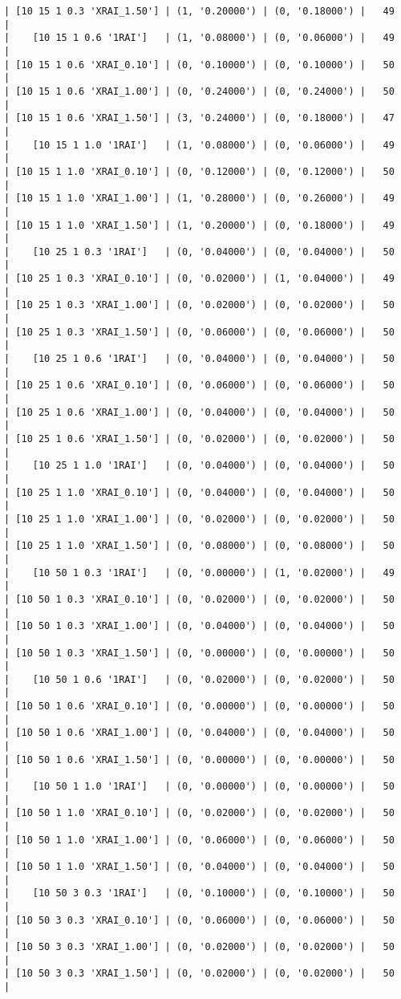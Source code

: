 \documentclass{article}
\begin{document}
\begin{verbatim}
| [10 15 1 0.3 'XRAI_1.50'] | (1, '0.20000') | (0, '0.18000') |   49  |
|    [10 15 1 0.6 '1RAI']   | (1, '0.08000') | (0, '0.06000') |   49  |
| [10 15 1 0.6 'XRAI_0.10'] | (0, '0.10000') | (0, '0.10000') |   50  |
| [10 15 1 0.6 'XRAI_1.00'] | (0, '0.24000') | (0, '0.24000') |   50  |
| [10 15 1 0.6 'XRAI_1.50'] | (3, '0.24000') | (0, '0.18000') |   47  |
|    [10 15 1 1.0 '1RAI']   | (1, '0.08000') | (0, '0.06000') |   49  |
| [10 15 1 1.0 'XRAI_0.10'] | (0, '0.12000') | (0, '0.12000') |   50  |
| [10 15 1 1.0 'XRAI_1.00'] | (1, '0.28000') | (0, '0.26000') |   49  |
| [10 15 1 1.0 'XRAI_1.50'] | (1, '0.20000') | (0, '0.18000') |   49  |
|    [10 25 1 0.3 '1RAI']   | (0, '0.04000') | (0, '0.04000') |   50  |
| [10 25 1 0.3 'XRAI_0.10'] | (0, '0.02000') | (1, '0.04000') |   49  |
| [10 25 1 0.3 'XRAI_1.00'] | (0, '0.02000') | (0, '0.02000') |   50  |
| [10 25 1 0.3 'XRAI_1.50'] | (0, '0.06000') | (0, '0.06000') |   50  |
|    [10 25 1 0.6 '1RAI']   | (0, '0.04000') | (0, '0.04000') |   50  |
| [10 25 1 0.6 'XRAI_0.10'] | (0, '0.06000') | (0, '0.06000') |   50  |
| [10 25 1 0.6 'XRAI_1.00'] | (0, '0.04000') | (0, '0.04000') |   50  |
| [10 25 1 0.6 'XRAI_1.50'] | (0, '0.02000') | (0, '0.02000') |   50  |
|    [10 25 1 1.0 '1RAI']   | (0, '0.04000') | (0, '0.04000') |   50  |
| [10 25 1 1.0 'XRAI_0.10'] | (0, '0.04000') | (0, '0.04000') |   50  |
| [10 25 1 1.0 'XRAI_1.00'] | (0, '0.02000') | (0, '0.02000') |   50  |
| [10 25 1 1.0 'XRAI_1.50'] | (0, '0.08000') | (0, '0.08000') |   50  |
|    [10 50 1 0.3 '1RAI']   | (0, '0.00000') | (1, '0.02000') |   49  |
| [10 50 1 0.3 'XRAI_0.10'] | (0, '0.02000') | (0, '0.02000') |   50  |
| [10 50 1 0.3 'XRAI_1.00'] | (0, '0.04000') | (0, '0.04000') |   50  |
| [10 50 1 0.3 'XRAI_1.50'] | (0, '0.00000') | (0, '0.00000') |   50  |
|    [10 50 1 0.6 '1RAI']   | (0, '0.02000') | (0, '0.02000') |   50  |
| [10 50 1 0.6 'XRAI_0.10'] | (0, '0.00000') | (0, '0.00000') |   50  |
| [10 50 1 0.6 'XRAI_1.00'] | (0, '0.04000') | (0, '0.04000') |   50  |
| [10 50 1 0.6 'XRAI_1.50'] | (0, '0.00000') | (0, '0.00000') |   50  |
|    [10 50 1 1.0 '1RAI']   | (0, '0.00000') | (0, '0.00000') |   50  |
| [10 50 1 1.0 'XRAI_0.10'] | (0, '0.02000') | (0, '0.02000') |   50  |
| [10 50 1 1.0 'XRAI_1.00'] | (0, '0.06000') | (0, '0.06000') |   50  |
| [10 50 1 1.0 'XRAI_1.50'] | (0, '0.04000') | (0, '0.04000') |   50  |
|    [10 50 3 0.3 '1RAI']   | (0, '0.10000') | (0, '0.10000') |   50  |
| [10 50 3 0.3 'XRAI_0.10'] | (0, '0.06000') | (0, '0.06000') |   50  |
| [10 50 3 0.3 'XRAI_1.00'] | (0, '0.02000') | (0, '0.02000') |   50  |
| [10 50 3 0.3 'XRAI_1.50'] | (0, '0.02000') | (0, '0.02000') |   50  |

\end{verbatim}
\end{document}
